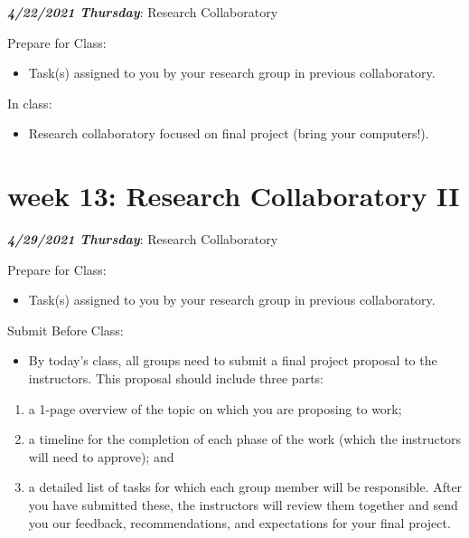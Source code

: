 \documentclass[
]{book}
\providecommand{\tightlist}{%
  \setlength{\itemsep}{0pt}\setlength{\parskip}{0pt}}
\begin{document}
\textbf{\emph{4/22/2021 Thursday}}: Research Collaboratory

Prepare for Class:

\begin{itemize}
\tightlist
\item
  Task(s) assigned to you by your research group in previous collaboratory.
\end{itemize}

In class:

\begin{itemize}
\tightlist
\item
  Research collaboratory focused on final project (bring your computers!).
\end{itemize}

\hypertarget{week-13-research-collaboratory-ii-1}{%
\chapter{week 13: Research Collaboratory II}\label{week-13-research-collaboratory-ii-1}}

\textbf{\emph{4/29/2021 Thursday}}: Research Collaboratory

Prepare for Class:

\begin{itemize}
\tightlist
\item
  Task(s) assigned to you by your research group in previous collaboratory.
\end{itemize}

Submit Before Class:

\begin{itemize}
\tightlist
\item
  By today's class, all groups need to submit a final project proposal to the instructors. This proposal should include three parts:
\end{itemize}

\begin{enumerate}
\def\labelenumi{(\arabic{enumi})}
\tightlist
\item
  a 1-page overview of the topic on which you are proposing to work;
\item
  a timeline for the completion of each phase of the work (which the instructors will need to approve); and
\item
  a detailed list of tasks for which each group member will be responsible. After you have submitted these, the instructors will review them together and send you our feedback, recommendations, and expectations for your final project.
\end{enumerate}
\end{document}

